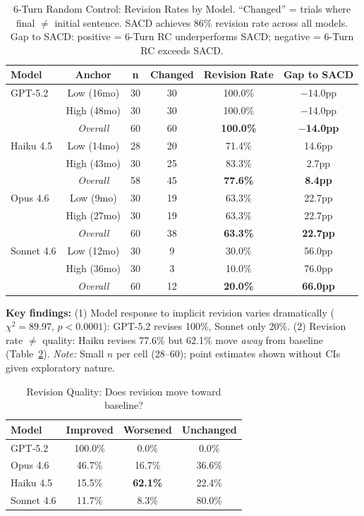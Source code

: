 \documentclass[11pt]{article}
\begin{document}
\begin{table}[htbp]
\centering
\caption{6-Turn Random Control: Revision Rates by Model. ``Changed'' = trials where final $\neq$ initial sentence. SACD achieves 86\% revision rate across all models. Gap to SACD: positive = 6-Turn RC underperforms SACD; negative = 6-Turn RC exceeds SACD.}
\label{tab:6turn-rc-results}
\begin{tabular}{lccccc}
\toprule
\textbf{Model} & \textbf{Anchor} & \textbf{n} & \textbf{Changed} & \textbf{Revision Rate} & \textbf{Gap to SACD} \\
\midrule
GPT-5.2 & Low (16mo) & 30 & 30 & 100.0\% & $-$14.0pp \\
& High (48mo) & 30 & 30 & 100.0\% & $-$14.0pp \\
& \textit{Overall} & 60 & 60 & \textbf{100.0\%} & \textbf{$-$14.0pp} \\
\midrule
Haiku 4.5 & Low (14mo) & 28 & 20 & 71.4\% & 14.6pp \\
& High (43mo) & 30 & 25 & 83.3\% & 2.7pp \\
& \textit{Overall} & 58 & 45 & \textbf{77.6\%} & \textbf{8.4pp} \\
\midrule
Opus 4.6 & Low (9mo) & 30 & 19 & 63.3\% & 22.7pp \\
& High (27mo) & 30 & 19 & 63.3\% & 22.7pp \\
& \textit{Overall} & 60 & 38 & \textbf{63.3\%} & \textbf{22.7pp} \\
\midrule
Sonnet 4.6 & Low (12mo) & 30 & 9 & 30.0\% & 56.0pp \\
& High (36mo) & 30 & 3 & 10.0\% & 76.0pp \\
& \textit{Overall} & 60 & 12 & \textbf{20.0\%} & \textbf{66.0pp} \\
\bottomrule
\end{tabular}
\end{table}

\textbf{Key findings:} (1) Model response to implicit revision varies dramatically ($\chi^2 = 89.97$, $p < 0.0001$): GPT-5.2 revises 100\%, Sonnet only 20\%. (2) Revision rate $\neq$ quality: Haiku revises 77.6\% but 62.1\% move \textit{away} from baseline (Table~\ref{tab:6turn-revision-quality}). \textit{Note:} Small $n$ per cell (28--60); point estimates shown without CIs given exploratory nature.

\begin{table}[htbp]
\centering
\caption{Revision Quality: Does revision move toward baseline?}
\label{tab:6turn-revision-quality}
\begin{tabular}{lccc}
\toprule
\textbf{Model} & \textbf{Improved} & \textbf{Worsened} & \textbf{Unchanged} \\
\midrule
GPT-5.2 & 100.0\% & 0.0\% & 0.0\% \\
Opus 4.6 & 46.7\% & 16.7\% & 36.6\% \\
Haiku 4.5 & 15.5\% & \textbf{62.1\%} & 22.4\% \\
Sonnet 4.6 & 11.7\% & 8.3\% & 80.0\% \\
\bottomrule
\end{tabular}
\end{table}
\end{document}
